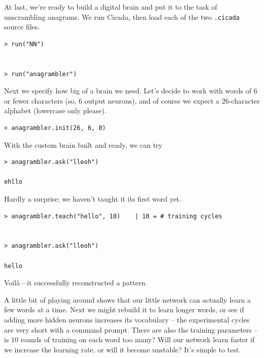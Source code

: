 \documentclass{article}
\newenvironment{code}{
       \begin{list}{}{
               \setlength{\leftmargin}{.4in}
               \setlength{\rightmargin}{0in}
               \setlength{\topsep}{.2in}
       }
       \small
       \item[] }
       { \end{list}   }
\begin{document}
At last, we're ready to build a digital brain and put it to the task of unscrambling anagrams.  We run Cicada, then load each of the two \verb#.cicada# source files.

\begin{code} \begin{verbatim}
> run("NN")


> run("anagrambler")
\end{verbatim} \end{code}

Next we specify how big of a brain we need.  Let's decide to work with words of 6 or fewer characters (so, 6 output neurons), and of course we expect a 26-character alphabet (lowercase only please).

\begin{code} \begin{verbatim}
> anagrambler.init(26, 6, 0)
\end{verbatim} \end{code}

With the custom brain built and ready, we can try

\begin{code} \begin{verbatim}
> anagrambler.ask("lleoh")

ehllo
\end{verbatim} \end{code}

\noindent Hardly a surprise; we haven't taught it its first word yet.

\begin{code} \begin{verbatim}
> anagrambler.teach("hello", 10)    | 10 = # training cycles


> anagrambler.ask("lleoh")

hello
\end{verbatim} \end{code}

\noindent Voil\`a---it successfully reconstructed a pattern.

A little bit of playing around shows that our little network can actually learn a few words at a time.  Next we might rebuild it to learn longer words, or see if adding more hidden neurons increases its vocabulary -- the experimental cycles are very short with a command prompt.  There are also the training parameters -- is 10 rounds of training on each word too many?  Will our network learn faster if we increase the learning rate, or will it become unstable?  It's simple to test.
\end{document}
